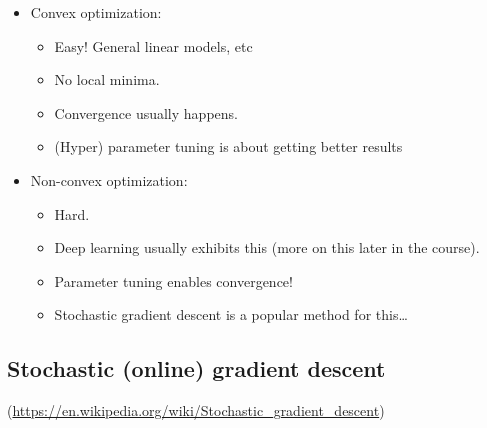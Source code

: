 \documentclass[fontset=fandol,zihao=false,scheme=chinese,heading=true,UTF8]{ctexbook}
\providecommand{\tightlist}{%
  \setlength{\itemsep}{0pt}\setlength{\parskip}{0pt}}
\begin{document}
\begin{itemize}
\tightlist
\item
  Convex optimization:

  \begin{itemize}
  \tightlist
  \item
    Easy! General linear models, etc
  \item
    No local minima.
  \item
    Convergence usually happens.
  \item
    (Hyper) parameter tuning is about getting better results
  \end{itemize}
\item
  Non-convex optimization:

  \begin{itemize}
  \tightlist
  \item
    Hard.
  \item
    Deep learning usually exhibits this (more on this later in the course).
  \item
    Parameter tuning enables convergence!
  \item
    Stochastic gradient descent is a popular method for this\ldots{}
  \end{itemize}
\end{itemize}

\hypertarget{stochastic-online-gradient-descent}{%
\subsection{Stochastic (online) gradient descent}\label{stochastic-online-gradient-descent}}

(\url{https://en.wikipedia.org/wiki/Stochastic_gradient_descent})
\end{document}
